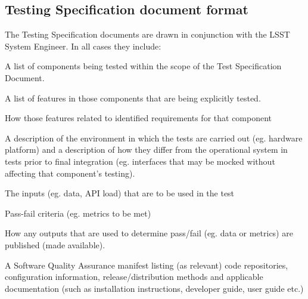   
\subsection{Testing Specification document format}\label{sect:tsform}

The Testing Specification documents are drawn in conjunction with the LSST System Engineer. In all cases they include:

\begin{itemize_single}

\item A list of components being tested within the scope of the Test Specification Document. 

\item A list of features in those components that are being explicitly tested.

\item How those features related to identified requirements for that component
  
\item A description of the environment in which the tests are carried out (eg. hardware platform) and a description of how they differ from the operational system in tests prior to final integration (eg. interfaces that may be mocked without affecting that component's testing). 
  
\item The inputs (eg. data, API load) that are to be used in the test

\item Pass-fail criteria (eg. metrics to be met) 

\item How any outputs that are used to determine pass/fail (eg. data or metrics) are published (made available). 

\item A Software Quality Assurance manifest listing (as relevant) code repositories, configuration information, release/distribution methods and applicable documentation (such as installation instructions, developer guide, user guide etc.)
  
\end{itemize_single}


